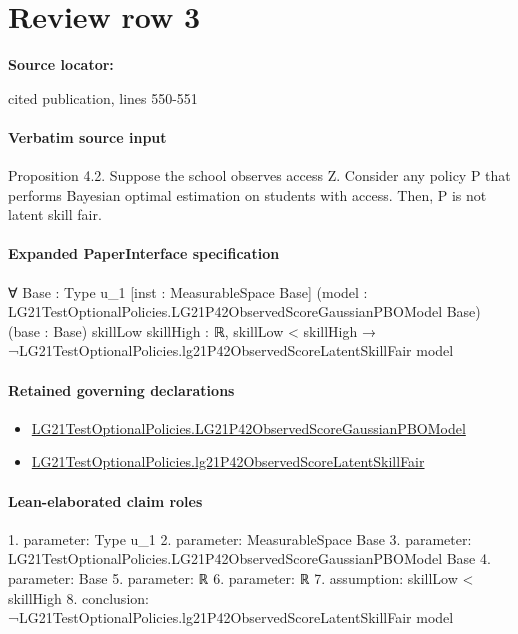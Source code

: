 \documentclass[10pt]{article}
\begin{document}
\section*{Review row 3}
\textbf{Source locator:} {\footnotesize\raggedright cited publication, lines 550-\allowbreak{}551\par}
\paragraph{Verbatim source input}
\begin{ReviewVerbatim}
Proposition 4.2. Suppose the school observes access Z. Consider any policy P that performs
Bayesian optimal estimation on students with access. Then, P is not latent skill fair.
\end{ReviewVerbatim}



\paragraph{Expanded PaperInterface specification}
\begin{ReviewVerbatim}
∀ {Base : Type u_1} [inst : MeasurableSpace Base]
  (model : LG21TestOptionalPolicies.LG21P42ObservedScoreGaussianPBOModel Base) (base : Base) {skillLow skillHigh : ℝ},
  skillLow < skillHigh → ¬LG21TestOptionalPolicies.lg21P42ObservedScoreLatentSkillFair model
\end{ReviewVerbatim}

\paragraph{Retained governing declarations}
\begin{itemize}\raggedright
\item \hyperlink{governing-declaration-5c6df9810b5b0d82}{LG21\allowbreak{}Test\allowbreak{}Optional\allowbreak{}Policies.\allowbreak{}LG21\allowbreak{}P42\allowbreak{}Observed\allowbreak{}Score\allowbreak{}Gaussian\allowbreak{}PBO\allowbreak{}Model}
\item \hyperlink{governing-declaration-586933cf5f37a308}{LG21\allowbreak{}Test\allowbreak{}Optional\allowbreak{}Policies.\allowbreak{}lg21\allowbreak{}P42\allowbreak{}Observed\allowbreak{}Score\allowbreak{}Latent\allowbreak{}Skill\allowbreak{}Fair}
\end{itemize}
\paragraph{Lean-elaborated claim roles}\begin{ReviewVerbatim}
1. parameter: Type u_1
2. parameter: MeasurableSpace Base
3. parameter: LG21TestOptionalPolicies.LG21P42ObservedScoreGaussianPBOModel Base
4. parameter: Base
5. parameter: ℝ
6. parameter: ℝ
7. assumption: skillLow < skillHigh
8. conclusion: ¬LG21TestOptionalPolicies.lg21P42ObservedScoreLatentSkillFair model
\end{ReviewVerbatim}
\end{document}
